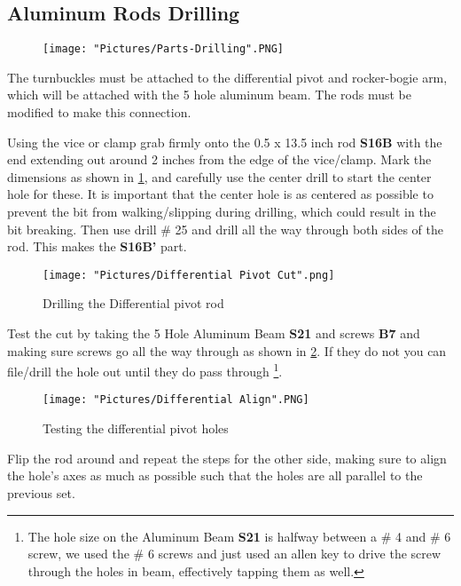 \documentclass[12pt]{article}
\begin{document}
\subsection{Aluminum Rods Drilling}

\begin{figure}[H]
	\centering
	\texttt{[image: "Pictures/Parts-Drilling".PNG]}
\end{figure}

The turnbuckles must be attached to the differential pivot and rocker-bogie arm, which will be attached with the 5 hole aluminum beam. The rods must be modified to make this connection. 

Using the vice or clamp grab firmly onto the 0.5 x 13.5 inch rod \textbf{S16B} with the end extending out around 2 inches from the edge of the vice/clamp. Mark the dimensions as shown in \ref{diff pivot rod}, and carefully use the center drill to start the center hole for these. It is important that the center hole is as centered as possible to prevent the bit from walking/slipping during drilling, which could result in the bit breaking. Then use drill \# 25 and drill all the way through both sides of the rod. This makes the \textbf{S16B'} part. 

\begin{figure}[H]
\centering	
  \texttt{[image: "Pictures/Differential Pivot Cut".png]}
	\caption{Drilling the Differential pivot rod}
	\label{diff pivot rod}
\end{figure}


Test the cut by taking the 5 Hole Aluminum Beam \textbf{S21} and screws \textbf{B7} and making sure screws go all the way through as shown in \ref{test}. If they do not you can file/drill the hole out until they do pass through \footnote{The hole size on the Aluminum Beam \textbf{S21} is halfway between a \# 4 and \# 6 screw, we used the \# 6 screws and just used an allen key to drive the screw through the holes in beam, effectively tapping them as well.}. 

\begin{figure}[H]
	\centering
	\texttt{[image: "Pictures/Differential Align".PNG]}
	\caption{Testing the differential pivot holes}
	\label{test}
\end{figure}

\noindent Flip the rod around and repeat the steps for the other side, making sure to align the hole's axes as much as possible such that the holes are all parallel to the previous set.
\end{document}
